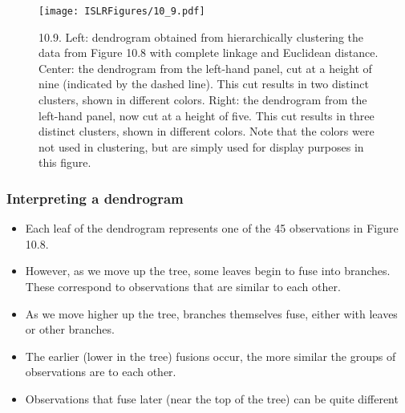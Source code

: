 \documentclass{beamer}
\begin{document}
                \begin{frame}
                	\begin{figure}
                		\centering
                		
                		\centering
                		\texttt{[image: ISLRFigures/10\_9.pdf]}
                		\caption{\tiny 10.9. Left: dendrogram obtained from hierarchically clustering the data
                			from Figure 10.8 with complete linkage and Euclidean distance. Center: the dendrogram
                			from the left-hand panel, cut at a height of nine (indicated by the dashed
                			line). This cut results in two distinct clusters, shown in different colors. Right:
                			the dendrogram from the left-hand panel, now cut at a height of five. This cut
                			results in three distinct clusters, shown in different colors. Note that the colors
                			were not used in clustering, but are simply used for display purposes in this figure.
                		}
                		
                		
                	\end{figure}
                \end{frame} 
                
                  
                 \begin{frame}
                 	\frametitle{Interpreting a dendrogram }
                 	\begin{itemize}
                 		\item Each leaf of the dendrogram represents
                 		one of the 45 observations in Figure 10.8. 
                 		
                 		\item However, as we move
                 		up the tree, some leaves begin to fuse into branches. These correspond to
                 		observations that are similar to each other.
                 		
                 		\item As we move higher up the tree,
                 		branches themselves fuse, either with leaves or other branches.
                 		
                 		        
                 		 \item The earlier
                 		 (lower in the tree) fusions occur, the more similar the groups of observations
                 		 are to each other.
                 		 
                 		\item Observations that fuse later
                 		(near the top of the tree) can be quite different
                 	 
                 	\end{itemize}
                 \end{frame}   
              
\end{document}
